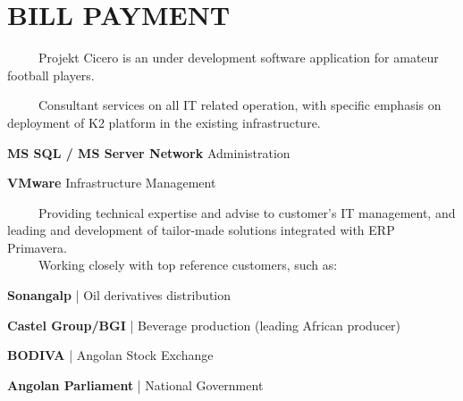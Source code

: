 \documentclass[letterpaper]{deedy-resume} %
\begin{document}
\begin{minipage}[t]{0.66\textwidth}

\section{BILL PAYMENT}


\-\	\ \ \ \ Projekt Cicero is an under development software application for amateur football players.


\-\	\ \ \ \ Consultant services on all IT related operation, with specific emphasis on deployment of K2 platform in the existing infrastructure. \\
\vspace{\topsep}
\begin{tightitemize}
	\item \textbf{MS SQL / MS Server Network} Administration
	\item \textbf{VMware} Infrastructure Management
\end{tightitemize}

\sectionspace


\-\	\ \ \ \ Providing technical expertise and advise to customer's IT management, and leading and development of tailor-made solutions integrated with ERP Primavera.\\
\-\	\ \ \ \ Working closely with top reference customers, such as:\\
\begin{tightitemize}
	\item \textbf{Sonangalp} | Oil derivatives distribution
	\item \textbf{Castel Group/BGI} | Beverage production (leading African producer)
	\item \textbf{BODIVA} | Angolan Stock Exchange
	\item \textbf{Angolan Parliament} | National Government
\end{tightitemize}

\sectionspace



\end{minipage}
\end{document}
